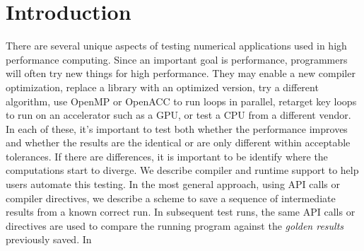 \section{Introduction}

There are several unique aspects of testing numerical applications used in high performance computing.
Since an important goal is performance, programmers will often try new things for high performance.
They may enable a new compiler optimization, replace a library with an optimized version, try a different algorithm, use OpenMP or OpenACC to run loops in parallel, retarget key loops to run on an accelerator such as a GPU, or test a CPU from a different vendor.
In each of these, it's important to test both whether the performance improves and whether the results are the identical or are only different within acceptable tolerances.
If there are differences, it is important to be identify where the computations start to diverge.
We describe compiler and runtime support to help users automate this testing.
In the most general approach, using API calls or compiler directives, we describe a scheme to save a sequence of intermediate results from a known correct run.
In subsequent test runs, the same API calls or directives are used to compare the running program against the \emph{golden results} previously saved.
In 

